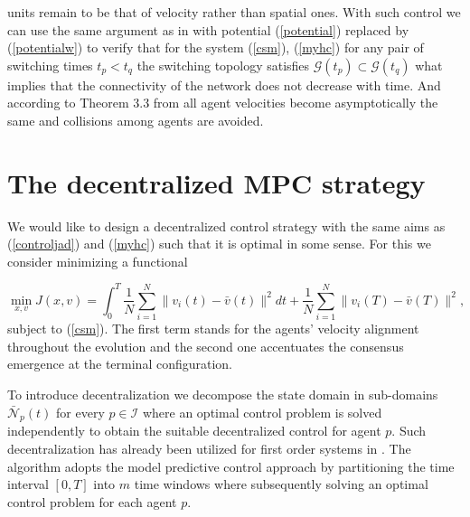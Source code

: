 \documentclass[a4paper,10pt, english]{article}
\begin{document}
units remain to be that of velocity rather than spatial ones. With such control we can use the same argument as in \cite{jfwpc} with potential (\ref{potential}) replaced by (\ref{potentialw})  to verify that for the system (\ref{csm}), (\ref{myhc})  
for any pair of switching times $t_p < t_q$ the switching topology satisfies $\mathcal{G}(t_p) \subset \mathcal{G}(t_q)$ what implies that the connectivity of the network does not decrease with time.
And according to Theorem 3.3 from \cite{jfwpc} all agent velocities become asymptotically the same and collisions among agents are avoided. 

































\section{The decentralized MPC strategy}
  We would like to design a decentralized control strategy with the same aims as (\ref{controljad}) and (\ref{myhc}) such that it is optimal in some sense. For this we consider minimizing a functional 
 
  \begin{equation}
  \min_{x, v} J(x, v) = \int_{0}^{T}\frac{1}{N}\sum_{i=1}^{N}\|v_i(t) - \bar{v}(t)\|^2 dt + \frac{1}{N}\sum_{i=1}^{N}\|v_i(T) - \bar{v}(T)\|^2,
 \label{j}
 \end{equation}
 subject to (\ref{csm}). The first term stands for the agents' velocity alignment throughout the evolution and the second one accentuates the consensus emergence at the terminal configuration. 
 
 To introduce decentralization we decompose the state domain in sub-domains $\bar{\mathcal{N}}_p(t)$ for every $p\in \mathcal{I}$ where an optimal control problem is solved independently to obtain the suitable decentralized control for agent $p$. Such decentralization has already been utilized for first order systems in \cite{jdccms}.
 The algorithm adopts the model predictive control approach by partitioning the time interval $[0, T]$ into $m$ time windows where subsequently solving an optimal control problem for each agent $p$.
 
\end{document}
